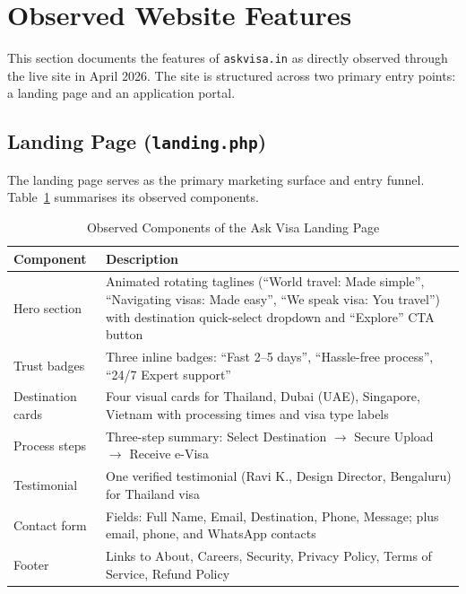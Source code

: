 \documentclass[journal, 10pt, twoside]{IEEEtran}
\begin{document}
\section{Observed Website Features}
\label{sec:siteoverview}

This section documents the features of \texttt{askvisa.in} as directly
observed through the live site in April 2026. The site is structured
across two primary entry points: a landing page and an application portal.

\subsection{Landing Page (\texttt{landing.php})}
The landing page serves as the primary marketing surface and entry funnel.
Table~\ref{tab:landing_features} summarises its observed components.

\begin{table}[ht]
  \centering
  \caption{Observed Components of the Ask Visa Landing Page}
  \label{tab:landing_features}
  \begin{tabular}{@{}p{2.2cm} p{5.4cm}@{}}
    \toprule
    \textbf{Component} & \textbf{Description} \\
    \midrule
    Hero section    & Animated rotating taglines (``World travel: Made
                      simple'', ``Navigating visas: Made easy'', ``We
                      speak visa: You travel'') with destination
                      quick-select dropdown and ``Explore'' CTA button \\
    Trust badges    & Three inline badges: ``Fast 2--5 days'',
                      ``Hassle-free process'', ``24/7 Expert support'' \\
    Destination cards & Four visual cards for Thailand, Dubai (UAE),
                      Singapore, Vietnam with processing times and visa
                      type labels \\
    Process steps   & Three-step summary: Select Destination $\rightarrow$
                      Secure Upload $\rightarrow$ Receive e-Visa \\
    Testimonial     & One verified testimonial (Ravi K.,
                      Design Director, Bengaluru) for Thailand visa \\
    Contact form    & Fields: Full Name, Email, Destination, Phone,
                      Message; plus email, phone, and WhatsApp contacts \\
    Footer          & Links to About, Careers, Security, Privacy Policy,
                      Terms of Service, Refund Policy \\
    \bottomrule
  \end{tabular}
\end{table}
\end{document}
